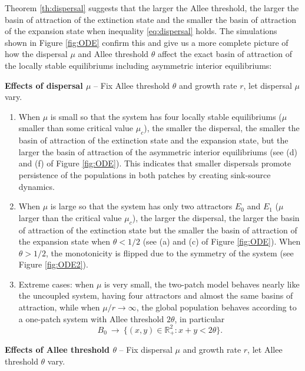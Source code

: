 \indent Theorem \ref{th:dispersal} suggests that the larger the Allee threshold, the larger the basin of attraction of the extinction
 state and the smaller the basin of attraction of the expansion state when inequality \eqref{eq:dispersal} holds.
 The simulations shown in Figure \ref{fig:ODE} confirm this and give us a more complete picture of how the dispersal $\mu$
 and Allee threshold $\theta$ affect the exact basin of attraction of the locally stable equilibriums including asymmetric
 interior equilibriums:
\pagebreak
\begin{description}
\item  {\bf Effects of dispersal $\mu$} -- Fix Allee threshold $\theta$ and growth rate $r$, let dispersal $\mu$ vary. \vspace{4pt}
\begin{enumerate}
\item When $\mu$ is small so that the system has four locally stable equilibriums ($\mu$ smaller than some critical value $\mu_c$),
 the smaller the dispersal, the smaller the basin of attraction of the extinction state and the expansion state, but the larger the
 basin of attraction of the asymmetric interior equilibriums (see (d) and (f) of Figure \ref{fig:ODE}).
 This indicates that smaller dispersals promote persistence of the populations in both patches by creating sink-source dynamics. \vspace{4pt}
\item When $\mu$ is large so that the system has only two attractors $E_0$ and $E_1$ ($\mu$ larger than the critical value $\mu_c$),
 the larger the dispersal, the larger the basin of attraction of the extinction state but the smaller the basin of attraction of the
 expansion state when $\theta < 1/2$ (see (a) and (c) of Figure \ref{fig:ODE}).
 When $\theta > 1/2$, the monotonicity is flipped due to the symmetry of the system (see Figure \ref{fig:ODE2}). \vspace{4pt}
\item Extreme cases: when $\mu$ is very small, the two-patch model behaves nearly like the uncoupled system, having four attractors
 and almost the same basins of attraction, while when $\mu / r {{\rightarrow}} \infty$, the global population behaves according to a one-patch
 system with Allee threshold $2 \theta$, in particular
 $$ B_0 \ \longrightarrow \ \{(x, y) \in {{\mathbb{R}}}^2_+ : x + y < 2 \theta \}. $$
\end{enumerate}
\item {\bf Effects of Allee threshold $\theta$} -- Fix dispersal $\mu$ and growth rate $r$, let Allee threshold $\theta$ vary. \vspace{4pt}

\end{description}
